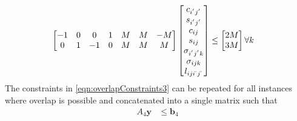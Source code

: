 	\begin{equation}\begin{aligned} 
		\begin{bmatrix} 
			-1 & 0 &  0 & 1 & M & M & -M \\
			 0 & 1 & -1 & 0 & M & M &  M \\
		\end{bmatrix} 
		\begin{bmatrix}
			c_{i^{'}j^{'}}       \\ 
			s_{i^{'}j^{'}}       \\
			c_{ij}               \\
			s_{ij}               \\ 
			\sigma_{i^{'}j^{'}k} \\ 
			\sigma_{ijk}         \\
			l_{iji^{`}j^{`}}     \\
		\end{bmatrix} &\le 
		\begin{bmatrix} 
			2M \\ 
			3M \\
		\end{bmatrix} \forall k
	\end{aligned} \end{equation}
	The constraints in \eqref{eqn:overlapConstraints3} can be repeated for all instances where overlap is possible and concatenated into a single matrix such that
	\begin{equation}\begin{aligned} 
		A_4\mathbf{y} & \le \mathbf{b}_4 \\
	\end{aligned} \end{equation} 
